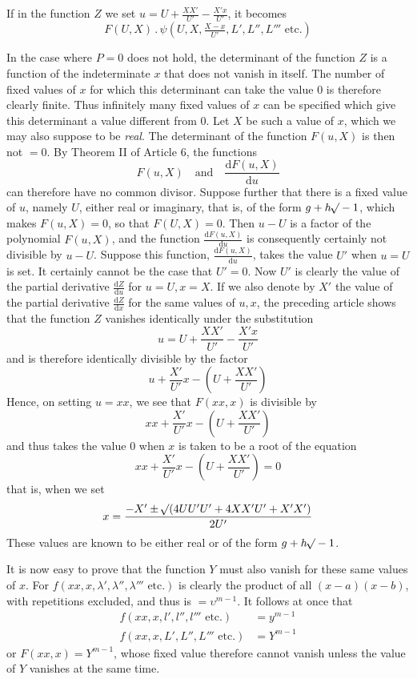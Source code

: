If in the function $Z$ we set $u=U+\frac{XX'}{U'}-\frac{X'x}{U'}$, it becomes
\[
F(U,X)\, .\,\psi(U,X,\tfrac{X-x}{U'},L',L'',L'''\text{ etc.})
\]

In the case where $P=0$ does not hold, the determinant of the function $Z$ is a function of the indeterminate $x$ that does not vanish in itself. The number of fixed values of $x$ for which this determinant can take the value 0 is therefore clearly finite. Thus infinitely many fixed values of $x$ can be specified which give this determinant a value different from 0. Let $X$ be such a value of $x$, which we may also suppose to be \textit{real}. The determinant of the function $F(u,X)$ is then not $=0$. By Theorem II of Article 6, the functions
\[
F(u,X)\quad\text{and}\quad\frac{\mathrm dF(u,X)}{\mathrm du}
\]
can therefore have no common divisor. Suppose further that there is a fixed value of $u$, namely $U$, either real or imaginary, that is, of the form $g+h\mathord{{}^{}\!\surd}-1$, which makes $F(u,X)=0$, so that $F(U,X)=0$. Then $u-U$ is a factor of the polynomial $F(u,X)$, and the function $\frac{\mathrm dF(u,X)}{\mathrm du}$ is consequently certainly not divisible by $u-U$. Suppose this function,
$\frac{\mathrm dF(u,X)}{\mathrm du}$, takes the value $U'$ when $u=U$ is set. It certainly cannot be the case that $U'=0$. Now $U'$ is clearly the value of the partial derivative $\frac{\mathrm dZ}{\mathrm du}$ for $u=U,x=X$. If we also denote by $X'$ the value of the partial derivative $\frac{\mathrm dZ}{\mathrm dx}$ for the same values of $u,x$, the preceding article shows that the function $Z$ vanishes identically under the substitution
\[
u=U+\frac{XX'}{U'}-\frac{X'x}{U'}
\]
and is therefore identically divisible by the factor
\[
u+\frac{X'}{U'}x-(U+\frac{XX'}{U'})
\]
Hence, on setting $u=xx$, we see that $F(xx,x)$ is divisible by
\[
xx+\frac{X'}{U'}x-(U+\frac{XX'}{U'})
\]
and thus takes the value 0 when $x$ is taken to be a root of the equation
\[
xx+\frac{X'}{U'}x-(U+\frac{XX'}{U'})=0
\]
that is, when we set
\[
x=\frac{-X'\pm\mathord{{}^{}\!\surd}(4UU'U'+4XX'U'+X'X')}{2U'}
\]
These values are known to be either real or of the form $g+h\mathord{{}^{}\!\surd}-1$.

It is now easy to prove that the function $Y$ must also vanish for these same values of $x$. For $f(xx,x,\lambda',\lambda'',\lambda'''\text{ etc.})$ is clearly the product of all $(x-a)(x-b)$, with repetitions excluded, and thus is $=\upsilon^{m-1}$. It follows at once that
\[
\begin{aligned}
f(xx,x,l',l'',l'''\text{ etc.})&=y^{m-1}\\
f(xx,x,L',L'',L'''\text{ etc.})&=Y^{m-1}
\end{aligned}
\]
or $F(xx,x)=Y^{m-1}$, whose fixed value therefore cannot vanish unless the value of $Y$ vanishes at the same time.

